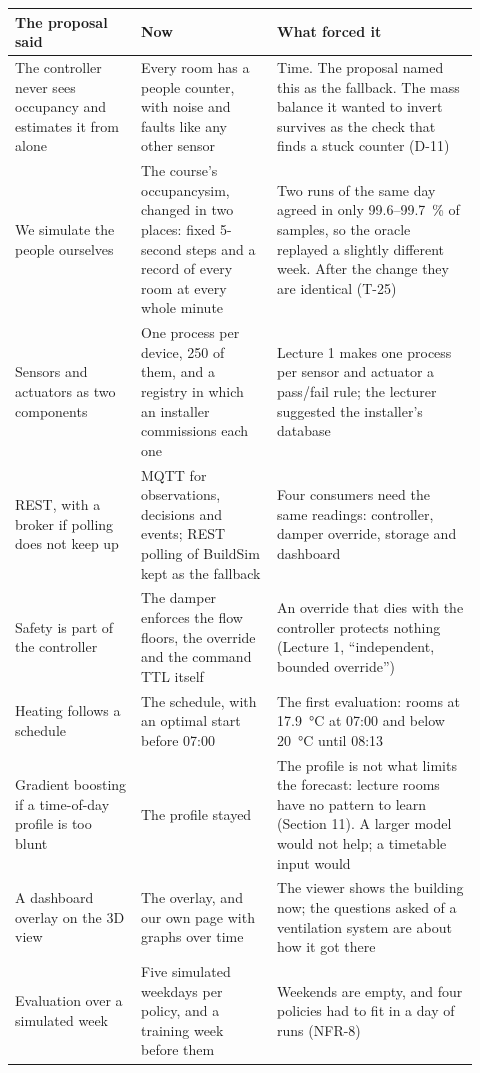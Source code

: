 \begin{longtable}[]{@{}L{0.25\linewidth}L{0.27\linewidth}L{0.40\linewidth}@{}}
\toprule
\textbf{The proposal said} & \textbf{Now} & \textbf{What forced it} \\
\midrule
\endhead
The controller never sees occupancy and estimates it from \COtwo{} alone &
Every room has a people counter, with noise and faults like any other sensor &
Time. The proposal named this as the fallback. The \COtwo{} mass balance it
wanted to invert survives as the check that finds a stuck counter (D-11) \\
We simulate the people ourselves &
The course's occupancysim, changed in two places: fixed 5-second steps and a
record of every room at every whole minute &
Two runs of the same day agreed in only 99.6--99.7~\% of samples, so the
oracle replayed a slightly different week. After the change they are
identical (T-25) \\
Sensors and actuators as two components &
One process per device, 250 of them, and a registry in which an installer
commissions each one &
Lecture 1 makes one process per sensor and actuator a pass/fail rule; the
lecturer suggested the installer's database \\
REST, with a broker if polling does not keep up &
MQTT for observations, decisions and events; REST polling of BuildSim kept as
the fallback &
Four consumers need the same readings: controller, damper override, storage
and dashboard \\
Safety is part of the controller &
The damper enforces the flow floors, the \COtwo{} override and the command TTL
itself &
An override that dies with the controller protects nothing (Lecture 1,
``independent, bounded override'') \\
Heating follows a schedule &
The schedule, with an optimal start before 07:00 &
The first evaluation: rooms at 17.9~°C at 07:00 and below 20~°C until 08:13 \\
Gradient boosting if a time-of-day profile is too blunt &
The profile stayed &
The profile is not what limits the forecast: lecture rooms have no pattern
to learn (Section 11). A larger model would not help; a timetable input would \\
A dashboard overlay on the 3D view &
The overlay, and our own page with graphs over time &
The viewer shows the building now; the questions asked of a ventilation system
are about how it got there \\
Evaluation over a simulated week &
Five simulated weekdays per policy, and a training week before them &
Weekends are empty, and four policies had to fit in a day of runs (NFR-8) \\
\bottomrule
\end{longtable}
